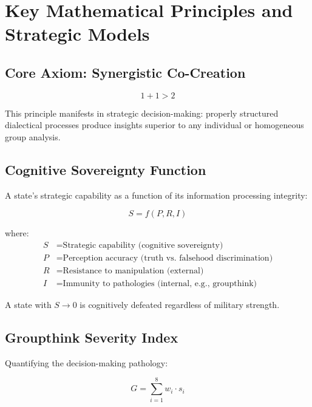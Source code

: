 \documentclass[11pt,a4paper]{article}
\begin{document}
\vspace{1cm}

\section*{Key Mathematical Principles and Strategic Models}

\subsection*{Core Axiom: Synergistic Co-Creation}
\begin{equation}
1 + 1 > 2
\label{eq:synergy}
\end{equation}

\noindent This principle manifests in strategic decision-making: properly structured dialectical processes produce insights superior to any individual or homogeneous group analysis.

\subsection*{Cognitive Sovereignty Function}
A state's strategic capability as a function of its information processing integrity:

\begin{equation}
S = f(P, R, I)
\label{eq:sovereignty}
\end{equation}

where:
\begin{align*}
S &= \text{Strategic capability (cognitive sovereignty)} \\
P &= \text{Perception accuracy (truth vs. falsehood discrimination)} \\
R &= \text{Resistance to manipulation (external)} \\
I &= \text{Immunity to pathologies (internal, e.g., groupthink)}
\end{align*}

\noindent A state with $S \to 0$ is cognitively defeated regardless of military strength.

\subsection*{Groupthink Severity Index}
Quantifying the decision-making pathology:

\begin{equation}
G = \sum_{i=1}^{8} w_i \cdot s_i
\label{eq:groupthink}
\end{equation}
\end{document}
